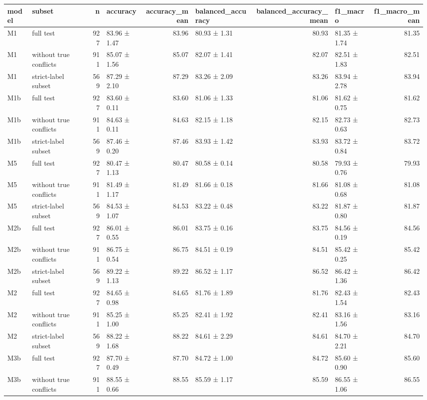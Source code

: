 \begin{tabular}{llrlrlrlr}
\toprule
model & subset & n & accuracy & accuracy\_mean & balanced\_accuracy & balanced\_accuracy\_mean & f1\_macro & f1\_macro\_mean \\
\midrule
M1 & full test & 927 & 83.96 ± 1.47 & 83.96 & 80.93 ± 1.31 & 80.93 & 81.35 ± 1.74 & 81.35 \\
M1 & without true conflicts & 911 & 85.07 ± 1.56 & 85.07 & 82.07 ± 1.41 & 82.07 & 82.51 ± 1.83 & 82.51 \\
M1 & strict-label subset & 569 & 87.29 ± 2.10 & 87.29 & 83.26 ± 2.09 & 83.26 & 83.94 ± 2.78 & 83.94 \\
M1b & full test & 927 & 83.60 ± 0.11 & 83.60 & 81.06 ± 1.33 & 81.06 & 81.62 ± 0.75 & 81.62 \\
M1b & without true conflicts & 911 & 84.63 ± 0.11 & 84.63 & 82.15 ± 1.18 & 82.15 & 82.73 ± 0.63 & 82.73 \\
M1b & strict-label subset & 569 & 87.46 ± 0.20 & 87.46 & 83.93 ± 1.42 & 83.93 & 83.72 ± 0.84 & 83.72 \\
M5 & full test & 927 & 80.47 ± 1.13 & 80.47 & 80.58 ± 0.14 & 80.58 & 79.93 ± 0.76 & 79.93 \\
M5 & without true conflicts & 911 & 81.49 ± 1.17 & 81.49 & 81.66 ± 0.18 & 81.66 & 81.08 ± 0.68 & 81.08 \\
M5 & strict-label subset & 569 & 84.53 ± 1.07 & 84.53 & 83.22 ± 0.48 & 83.22 & 81.87 ± 0.80 & 81.87 \\
M2b & full test & 927 & 86.01 ± 0.55 & 86.01 & 83.75 ± 0.16 & 83.75 & 84.56 ± 0.19 & 84.56 \\
M2b & without true conflicts & 911 & 86.75 ± 0.54 & 86.75 & 84.51 ± 0.19 & 84.51 & 85.42 ± 0.25 & 85.42 \\
M2b & strict-label subset & 569 & 89.22 ± 1.13 & 89.22 & 86.52 ± 1.17 & 86.52 & 86.42 ± 1.36 & 86.42 \\
M2 & full test & 927 & 84.65 ± 0.98 & 84.65 & 81.76 ± 1.89 & 81.76 & 82.43 ± 1.54 & 82.43 \\
M2 & without true conflicts & 911 & 85.25 ± 1.00 & 85.25 & 82.41 ± 1.92 & 82.41 & 83.16 ± 1.56 & 83.16 \\
M2 & strict-label subset & 569 & 88.22 ± 1.68 & 88.22 & 84.61 ± 2.29 & 84.61 & 84.70 ± 2.21 & 84.70 \\
M3b & full test & 927 & 87.70 ± 0.49 & 87.70 & 84.72 ± 1.00 & 84.72 & 85.60 ± 0.90 & 85.60 \\
M3b & without true conflicts & 911 & 88.55 ± 0.66 & 88.55 & 85.59 ± 1.17 & 85.59 & 86.55 ± 1.06 & 86.55 \\

\end{tabular}
